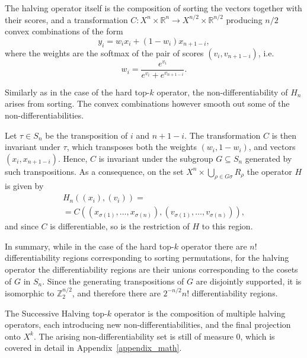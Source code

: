 \documentclass{article}
\newcommand{\RR}{\mathbb{R}}
\newcommand{\ZZ}{\mathbb{Z}}
\begin{document}
The halving operator itself is the composition of sorting the vectors together with their scores, and a transformation \(C\colon X^{n}\times\RR^{n}\to X^{n/2}\times\RR^{n/2}\) producing \(n/2\) convex combinations of the form 
\begin{equation}
    \label{eq:convex-op-1}
  y_{i} = w_{i} x_{i} + (1-w_{i}) x_{n+1-i},
\end{equation}
where the weights are the softmax of the pair of scores \((v_{i}, v_{n+1-i})\), i.e.
\begin{equation}
    \label{eq:convex-op-2}
    w_{i} = \frac{e^{v_{i}}}{e^{v_{i}} + e^{v_{n+1-i}}}.
\end{equation}

Similarly as in the case of the hard top-\(k\) operator, the non-differentiability of \(H_{n}\) arises from sorting. The convex combinations however smooth out some of the non-differentiabilities.

Let \(\tau\in S_{n}\) be the transposition of \(i\) and \(n+1-i\). The transformation \(C\) is then invariant under \(\tau\), which transposes both the weights \((w_{i}, 1-w_{i})\), and vectors \((x_{i}, x_{n+1-i})\). Hence, \(C\) is invariant under the subgroup \(G\subseteq S_{n}\) generated by such transpositions. As a consequence, on the set \(X^{n}\times \bigcup_{\rho\in G\sigma}R_{\rho}\) the operator \(H\) is given by
\begin{multline}
  H_{n}((x_{i}), (v_{i})) =\\= C((x_{\sigma(1)}, \dots, x_{\sigma(n)}), (v_{\sigma(1)}, \dots, v_{\sigma(n)})),
\end{multline}
and since \(C\) is differentiable, so is the restriction of \(H\) to this region.

In summary, while in the case of the hard top-\(k\) operator there are \(n!\) differentiability regions corresponding to sorting permutations, for the halving operator the differentiability regions are their unions corresponding to the cosets of \(G\) in \(S_{n}\). Since the generating transpositions of \(G\) are disjointly supported, it is isomorphic to \(\ZZ_{2}^{n/2}\), and therefore there are \(2^{-n/2}n!\) differentiability regions.

The Successive Halving top-$k$ operator is the composition of multiple halving operators, each introducing new non-differentiabilities, and the final projection onto $X^{k}$. The arising non-differentiability set is still of measure $0$, which is covered in detail in Appendix~\ref{appendix_math}.
\end{document}
